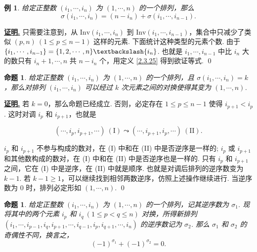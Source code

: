 \documentclass[10pt,openany]{article}
\theoremstyle{thmstyle} %
\theoremstyle{defstyle} %
\theoremstyle{prostyle} %
\newtheorem{proposition}[theorem]{命题}
\theoremstyle{exastyle}
\newtheorem{example}[theorem]{例}
\theoremstyle{remstyle}
\renewenvironment{proof}[1][证明]{\par\underline{\textbf{#1.}} \;\fangsong}{\qed\par}
\begin{document}
\begin{example} \label{2.3.26}
	给定正整数 \( (i_1,\cdots,i_n) \) 为 \( (1,\cdots,n) \) 的一个排列，那么 
	\[ \sigma(i_1,\cdots,i_n)=(n-i_n)+\sigma(i_1,\cdots,i_{n-1}). \]
\end{example}

\begin{proof}
	只需要注意到，从 \( \text{Inv}(i_1,\cdots,i_n) \) 到 \( \text{Inv}(i_1,\cdots,i_{n-1}) \)，集合中只减少了类似 \( (p,n) \ (1 \leq p \leq n-1) \) 这样的元素. 下面统计这种类型的元素个数. 由于 \( \{ i_1,\cdots,i_{n-1} \}= \{1,2,\cdots,n\} \textbackslash \{i_n\} \). 也就是 \( i_1,\cdots,i_{n-1} \) 中比 \( i_n \) 大的数只有 \( i_n+1,\cdots,n \) 共 \( n-i_n \) 个，用定义 \ref{2.3.25} 得到欲证等式.
\end{proof}

\begin{proposition} \label{2.3.27}
	给定正整数 \( (i_1,\cdots,i_n) \) 为 \( (1,\cdots,n) \) 的一个排列，且 \( \sigma(i_1,\cdots,i_n)=k \)，那么对排列 \( (i_1,\cdots,i_n) \) 可以经过 \( k \) 次元素之间的对换使得其变为 \( (1,\cdots,n) \). 
\end{proposition}

\begin{proof}
	若 \( k=0 \)，那么命题已经成立. 否则，必定存在 \( 1 \leq p \leq n-1 \) 使得 \( i_{p+1}<i_{p} \). 这时对调 \( i_p \) 和 \( i_{p+1} \)，也就是
	
	\[ (\cdots,i_p,i_{p+1},\cdots) \ (\text{I}) \leadsto (\cdots,i_{p+1},i_{p},\cdots) \ (\text{II}). \]
	
	\( i_p \) 和 \( i_{p+1} \) 不参与构成的数对，在 (I) 中和在 (II) 中是否逆序是一样的; \( i_p \) 或 \( i_{p+1} \) 和其他数构成的数对，在 (I) 中和在 (II) 中是否逆序也是一样的. 只有 \( i_p \) 和 \( i_{p+1} \) 之间，它在 (I) 中是逆序，在 (II) 中就是顺序. 也就是对调后排列的逆序数变为 \( k-1 \). 若 \( k-1 \geq 1 \)，可以继续找到相邻两数逆序，仿照上述操作继续进行. 当逆序数为 0 时，排列必定形如  \( (1,\cdots,n) \).
\end{proof}
 
\begin{proposition} \label{2.3.28}
	给定正整数 \( (i_1,\cdots,i_n) \) 为 \( (1,\cdots,n) \) 的一个排列，记其逆序数为 \( \sigma_1 \). 现将其中的两个元素 \( i_p \) 和 \( i_q \ (1 \leq p<q \leq n) \) 对换，所得新排列 \( (i_1,\cdots,i_{p-1},i_q,i_{p+1},\cdots,i_{q-1},i_p,i_{q+1},\cdots,i_n) \) 的逆序数记为 \( \sigma_2 \). 那么 \( \sigma_1 \) 和 \( \sigma_2 \) 的奇偶性不同，换言之，
	\[ (-1)^{\sigma_1}+(-1)^{\sigma_2}=0. \]
\end{proposition}
\end{document}
